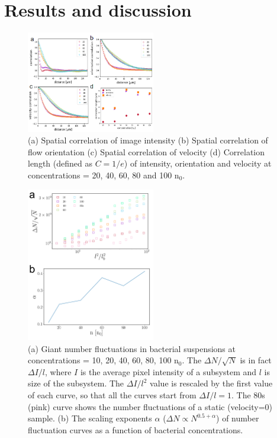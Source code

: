 \documentclass[twocolumn,aps,pre,amsmath,amssymb,floatfix,longbibliography]{revtex4-1}
\begin{document}
\section{Results and discussion}

\begin{figure}[!]
\begin{center}
\includegraphics[width=0.5\textwidth]{GNF-figures-2.png}
\caption[]{(a) Spatial correlation of image intensity (b) Spatial correlation of flow orientation (c) Spatial correlation of velocity (d) Correlation length (defined as $C=1/e$) of intensity, orientation and velocity at concentrations = 20, 40, 60, 80 and 100 n$_0$.}
\label{fig:2}
\end{center}
\end{figure}

\begin{figure}[!]
\begin{center}
\includegraphics[width=0.5\textwidth]{GNF-figures-3.png}
\caption[]{(a) Giant number fluctuations in bacterial suspensions at concentrations = 10, 20, 40, 60, 80, 100 n$_0$. The $\Delta N/\sqrt{N}$ is in fact $\Delta I/l$, where $I$ is the average pixel intensity of a subsystem and $l$ is size of the subsystem. The $\Delta I/l^2$ value is rescaled by the first value of each curve, so that all the curves start from $\Delta I/l=1$. The 80s (pink) curve shows the number fluctuations of a static (velocity=0) sample. (b) The scaling exponents $\alpha$ ($\Delta N \propto N^{0.5+\alpha}$) of number fluctuation curves as a function of bacterial concentrations. }
\label{fig:3}
\end{center}
\end{figure}
\end{document}
